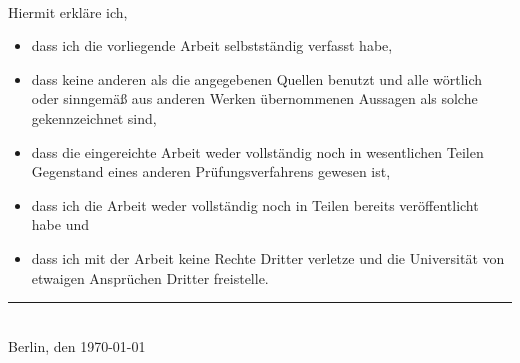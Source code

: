 
\maketitle
\clearpage
~



\noindent Hiermit erkläre ich,
	\begin{itemize}
	\item dass ich die vorliegende Arbeit selbstständig verfasst habe,
	\item dass keine anderen als die angegebenen Quellen benutzt und alle wörtlich oder sinngemä{\ss} aus anderen Werken übernommenen Aussagen als solche gekennzeichnet sind,
	\item dass die eingereichte Arbeit weder vollständig noch in wesentlichen Teilen Gegenstand eines anderen Prüfungsverfahrens gewesen ist,
	\item dass ich die Arbeit weder vollständig noch in Teilen bereits veröffentlicht habe und 
	\item dass ich mit der Arbeit keine Rechte Dritter verletze und die Universität von etwaigen Ansprüchen Dritter freistelle.
	\end{itemize}
\vspace*{8em}

\noindent\rule{6cm}{0.66pt}\\
Berlin,{ den \today}

\clearpage\newpage




\tableofcontents

\listoffigures
\newpage

% 
% 
